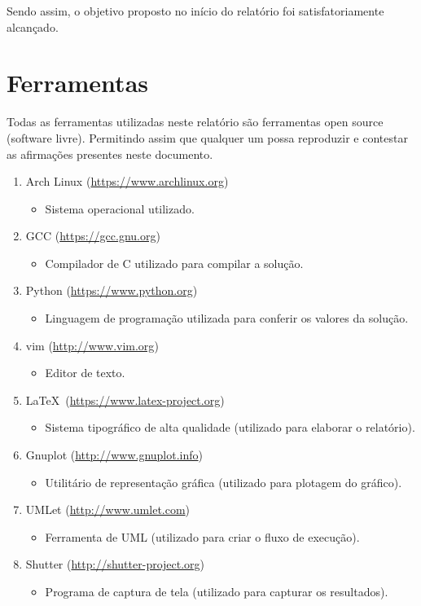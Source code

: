 \documentclass[12pt, hidelinks]{article}
\begin{document}
Sendo assim, o objetivo proposto no início do relatório foi satisfatoriamente alcançado.

\newpage
\section{Ferramentas}
Todas as ferramentas utilizadas neste relatório são ferramentas open source (software livre).
Permitindo assim que qualquer um possa reproduzir e contestar as afirmações presentes neste documento.

\begin{enumerate}
  \item Arch Linux (\url{https://www.archlinux.org})
    \begin{itemize}
      \item Sistema operacional utilizado.
    \end{itemize}
  \item GCC (\url{https://gcc.gnu.org})
    \begin{itemize}
      \item Compilador de C utilizado para compilar a solução.
    \end{itemize}
  \item Python (\url{https://www.python.org})
    \begin{itemize}
      \item Linguagem de programação utilizada para conferir os valores da solução.
    \end{itemize}
  \item vim (\url{http://www.vim.org})
    \begin{itemize}
      \item Editor de texto.
    \end{itemize}
  \item \LaTeX~(\url{https://www.latex-project.org})
    \begin{itemize}
      \item Sistema tipográfico de alta qualidade (utilizado para elaborar o relatório).
    \end{itemize}
  \item Gnuplot (\url{http://www.gnuplot.info})
    \begin{itemize}
      \item Utilitário de representação gráfica (utilizado para plotagem do gráfico).
    \end{itemize}
  \item UMLet (\url{http://www.umlet.com})
    \begin{itemize}
      \item Ferramenta de UML (utilizado para criar o fluxo de execução).
    \end{itemize}
  \item Shutter (\url{http://shutter-project.org})
    \begin{itemize}
      \item Programa de captura de tela (utilizado para capturar os resultados).
    \end{itemize}
\end{enumerate}

\end{document}
